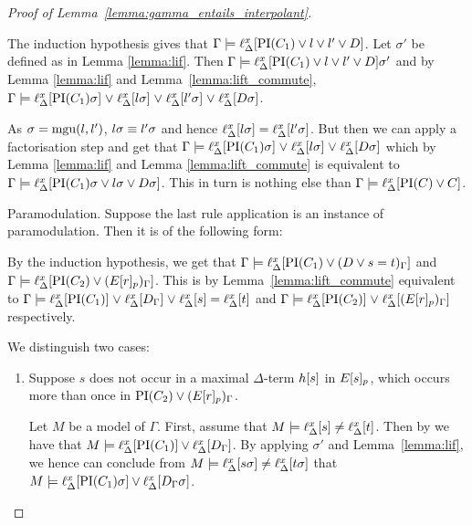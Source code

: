 \begin{proof}[Proof of Lemma~\ref{lemma:gamma_entails_interpolant}]
\begin{description}
			The induction hypothesis gives that
			$\Gamma \models \ell_{\Delta}^{x}[\operatorname{PI}(C_1) \lor l \lor l' \lor D]$.
			Let $\sigma'$ be defined as in Lemma \ref{lemma:lif}.
			Then $\Gamma \models \ell_{\Delta}^{x}[\operatorname{PI}(C_1) \lor l \lor l' \lor D]\sigma'$ and by Lemma \ref{lemma:lif} and Lemma~\ref{lemma:lift_commute},
			$\Gamma \models \ell_{\Delta}^{x}[\operatorname{PI}(C_1)\sigma] \;{\lor}\; \ell_{\Delta}^{x}[l\sigma] \;{\lor}\; \ell_{\Delta}^{x}[l'\sigma] \;{\lor}\; \ell_{\Delta}^{x}[D\sigma]$.

			As $\sigma = \operatorname{mgu}(l, l')$, $l\sigma \equiv l'\sigma$ and hence $\ell_{\Delta}^{x}[l\sigma] = \ell_{\Delta}^{x}[l'\sigma]$.
			But then we can apply a factorisation step and get that
			$\Gamma \models \ell_{\Delta}^{x}[\operatorname{PI}(C_1)\sigma] \;{\lor}\; \ell_{\Delta}^{x}[l\sigma] \;{\lor}\; \ell_{\Delta}^{x}[D\sigma]$
			which by Lemma \ref{lemma:lif} and Lemma \ref{lemma:lift_commute} is equivalent to 
			$\Gamma \entails\nolinebreak \lifdelta{\PI(C_1)\sigma \lor l\sigma \lor D\sigma}$.
			This in turn is nothing else than $\Gamma \models \ell_{\Delta}^{x}[\operatorname{PI}(C) \lor C]$.

		\item{Paramodulation.}
			Suppose the last rule application is an instance of paramodulation. Then it is of the following form:
			\begin{prooftree}
			\end{prooftree}
			By the induction hypothesis, we get that 
			$\Gamma \models \ell_{\Delta}^{x}[\operatorname{PI}(C_1) \lor (D\lor s=t)_\Gamma]$ and 
			$\Gamma \models \ell_{\Delta}^{x}[\operatorname{PI}(C_2) \lor (E{[r]_{p}})_\Gamma]$.
			This is by Lemma~\ref{lemma:lift_commute} equivalent to
			\markA{} $\Gamma \models \ell_{\Delta}^{x}[\operatorname{PI}(C_1)] \;{\lor}\;\allowbreak \ell_{\Delta}^{x}[D_\Gamma] \;{\lor}\; \ell_{\Delta}^{x}[s] = \ell_{\Delta}^{x}[t]$
			and \markB{} 
			$\Gamma \models \ell_{\Delta}^{x}[\operatorname{PI}(C_2)] \;{\lor}\; \ell_{\Delta}^{x}[(E{[r]_{p}})_\Gamma]$ respectively.


				We distinguish two cases:\nopagebreak
				\begin{enumerate}
					\item Suppose $s$ does not occur in a maximal $\Delta$-term $h[s]$ in $E{[s]_{p}}$, which occurs more than once in $\operatorname{PI}(C_2) \lor (E{[r]_{p}})_\Gamma$.
						\label{klehjy}

						Let $M$ be a model of $\Gamma$.
						First, assume that $M \models \ell_{\Delta}^{x}[s] \neq \ell_{\Delta}^{x}[t]$.
						Then by \markA{} we have that $M \models \ell_{\Delta}^{x}[\operatorname{PI}(C_1)] \lor \ell_{\Delta}^{x}[D_\Gamma]$.
						By applying $\sigma'$ and Lemma~\ref{lemma:lif}, we hence can conclude from 
						$M \models \ell_{\Delta}^{x}[s\sigma] \neq \ell_{\Delta}^{x}[t\sigma]$ that 
						$M \models \ell_{\Delta}^{x}[\operatorname{PI}(C_1)\sigma] \lor \ell_{\Delta}^{x}[D_\Gamma\sigma]$.



\end{enumerate}
\end{description}
\end{proof}
